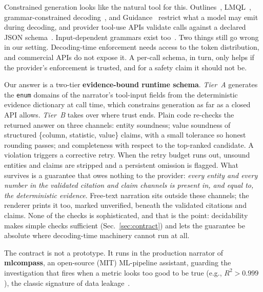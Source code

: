 \documentclass[conference]{IEEEtran}
\begin{document}
Constrained generation looks like the natural tool for this. Outlines~\cite{outlines}, LMQL~\cite{lmql}, grammar-constrained decoding~\cite{gcd}, and Guidance~\cite{guidance} restrict what a model may emit during decoding, and provider tool-use APIs validate calls against a declared JSON schema~\cite{structured}. Input-dependent grammars exist too~\cite{gcd}. Two things still go wrong in our setting. Decoding-time enforcement needs access to the token distribution, and commercial APIs do not expose it. A per-call schema, in turn, only helps if the provider's enforcement is trusted, and for a safety claim it should not be.

Our answer is a two-tier \textbf{evidence-bound runtime schema}. \emph{Tier~A} generates the \texttt{enum} domains of the narrator's tool-input fields from the deterministic evidence dictionary at call time, which constrains generation as far as a closed API allows. \emph{Tier~B} takes over where trust ends. Plain code re-checks the returned answer on three channels: entity soundness; value soundness of structured \{column, statistic, value\} claims, with a small tolerance so honest rounding passes; and completeness with respect to the top-ranked candidate. A violation triggers a corrective retry. When the retry budget runs out, unsound entities and claims are stripped and a persistent omission is flagged. What survives is a guarantee that owes nothing to the provider: \emph{every entity and every number in the validated citation and claim channels is present in, and equal to, the deterministic evidence}. Free-text narration sits outside these channels; the renderer prints it too, marked unverified, beneath the validated citations and claims. None of the checks is sophisticated, and that is the point: decidability makes simple checks sufficient (Sec.~\ref{sec:contract}) and lets the guarantee be absolute where decoding-time machinery cannot run at all.

The contract is not a prototype. It runs in the production narrator of \textbf{mlcompass}, an open-source (MIT) ML-pipeline assistant, guarding the investigation that fires when a metric looks too good to be true (e.g., $R^2 > 0.999$), the classic signature of data leakage~\cite{leakage}.
\end{document}
